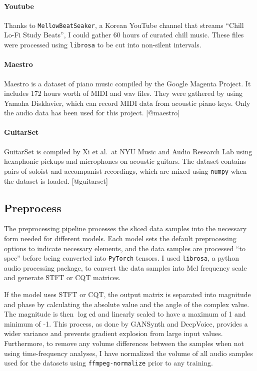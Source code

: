 \documentclass[12pt,a4paper,]{report}
\begin{document}
\paragraph{Youtube}

Thanks to \texttt{MellowBeatSeaker}, a Korean YouTube channel that
streams ``Chill Lo-Fi Study Beats'', I could gather 60 hours of curated
chill music. These files were processed using \texttt{librosa} to be cut
into non-silent intervals.

\paragraph{Maestro}

Maestro is a dataset of piano music compiled by the Google Magenta
Project. It includes 172 hours worth of MIDI and wav files. They were
gathered by using Yamaha Disklavier, which can record MIDI data from
acoustic piano keys. Only the audio data has been used for this project.
{[}@maestro{]}

\paragraph{GuitarSet}

GuitarSet is compiled by Xi et al.~at NYU Music and Audio Research Lab
using hexaphonic pickups and microphones on acoustic guitars. The
dataset contains pairs of soloist and accompanist recordings, which are
mixed using \texttt{numpy} when the dataset is loaded. {[}@guitarset{]}

\hypertarget{preprocess}{%
\subsection{Preprocess}\label{preprocess}}

The preprocessing pipeline processes the sliced data samples into the
necessary form needed for different models. Each model sets the default
preprocessing options to indicate necessary elements, and the data
samples are processed ``to spec'' before being converted into
\texttt{PyTorch} tensors. I used \texttt{librosa}, a python audio
processing package, to convert the data samples into Mel frequency scale
and generate STFT or CQT matrices.

If the model uses STFT or CQT, the output matrix is separated into
magnitude and phase by calculating the absolute value and the angle of
the complex value. The magnitude is then \(\log\)ed and linearly scaled
to have a maximum of 1 and minimum of -1. This process, as done by
GANSynth and DeepVoice, provides a wider variance and prevents gradient
explosion from large input values. Furthermore, to remove any volume
differences between the samples when not using time-frequency analyses,
I have normalized the volume of all audio samples used for the datasets
using \texttt{ffmpeg-normalize} prior to any training.
\end{document}
